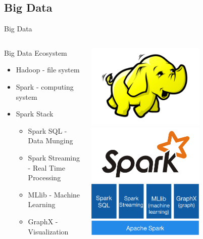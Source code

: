\documentclass[10pt]{beamer}
\begin{document}
  \subsection{Big Data}

    \begin{frame}{Big Data}
      \begin{columns}
        \begin{column}[T]{0.48\textwidth}
          \begin{block}{Big Data Ecosystem}
            \begin{itemize}
              \item<1-> Hadoop - file system
              \item<2-> Spark - computing system
              \item<3-> Spark Stack
                \begin{itemize}
                  \item<4-> Spark SQL - Data Munging
                  \item<4-> Spark Streaming - Real Time Processing
                  \item<4-> MLlib - Machine Learning
                  \item<4-> GraphX - Visualization
                \end{itemize}
            \end{itemize}
          \end{block}
        \end{column}
        \begin{column}[T]{0.48\textwidth}
          \begin{overprint}
            \includegraphics[width=160pt]{../graphs/logo/hadoop}
            \includegraphics[width=160pt]{../graphs/logo/spark}
            \includegraphics[width=160pt]{../graphs/logo/spark-stack}
            

\end{overprint}
\end{column}
\end{columns}
\end{frame}
\end{document}
